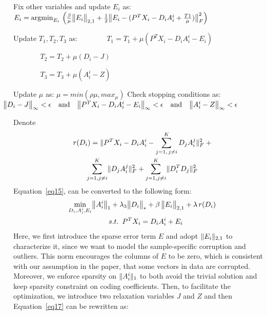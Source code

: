 \documentclass[journal]{IEEEtran}
\makeatletter
\def\NoNumber#1{{\def\alglinenumber##1{}\State #1}\addtocounter{ALG@line}{-1}}
\DeclareMathOperator*{\argmin}{\arg\!\min}
\DeclarePairedDelimiter\norm{\lVert}{\rVert}
\makeatother
\begin{document}
\begin{algorithm}[h]
\begin{algorithmic}[1]
    \State Fix other variables and update $E_i$ as:
    \vspace{2mm}   
    \NoNumber{$E_i = \argmin_{E_i} \, \Big( \frac{\beta}{\mu} \norm[\big]{E_i}_{2,1} + \frac{1}{2} \norm[\big]{E_i - (P^T X_i - D_i A_i^i + \frac{T1}{\mu})}_{F}^2 \Big) $}
    \vspace{2mm}   
    \State Update $T_1,T_2,T_3$ as: 
    \vspace{2mm}    
    \NoNumber{$\hspace{45pt} T_1 = T_1 + \mu (P^T X_i - D_i A_i^i - E_i)$}
    \NoNumber{$\hspace{45pt} T_2 = T_2 + \mu (D_i - J)$} 
    \NoNumber{$\hspace{45pt} T_3 = T_3 + \mu (A_i^i - Z)$} 
    \vspace{2mm}    
    \State Update $\mu$ as: $\mu = min(\rho \mu, max_{\mu})$    
    \vspace{2mm}    
    \State Check stopping conditions as: 
    \vspace{2mm}
    \NoNumber{$\hspace{-15pt} \norm[\big]{D_i - J}_{\infty} < \epsilon \quad \text{and} \quad \norm[\big]{P^T X_i - D_i A_i^i - E_i}_{\infty} < \epsilon \quad \text{and} \quad \norm[\big]{A_i^i - Z}_{\infty} < \epsilon $}
\EndWhile
\end{algorithmic}
\end{algorithm}
Denote
\begin{gather}
r(D_i) = \norm{P^T X_i - D_i A_i^i - \sum_{\substack{j=1, \, j \neq i}}^K D_j A_i^j}_{F}^2 \> +
\label{eq16} \\ \notag
\sum_{\substack{j=1, j \neq i}}^K \norm{D_j A_i^j}_{F}^2 + \sum_{\substack{j=1, j \neq i}}^K \norm{D_i^T D_j}_{F}^2
\end{gather}
Equation~\eqref{eq15}, can be converted to the following form:
\begin{gather}
\min_{D_i,A_i^i,E_i} \norm[\big]{A_i^i}_{1} + \lambda_3 \norm[\big]{D_i}_{*} + \beta \, \norm[\big]{E_i}_{2,1} + \lambda \, r(D_i)
\label{eq17} \\ \notag
\quad s.t. \,\,\, P^T X_i = D_i A_i^i + E_i
\end{gather}
Here, we first introduce the sparse error term $E$ and adopt $\norm{E_i}_{2,1}$ to characterize it, since we want to model the sample-specific corruption and outliers. This norm encourages the columns of $E$ to be zero, which is consistent with our assumption in the paper, that some vectors in data are corrupted. Moreover, we enforce sparsity on $\norm{A_i^i}_{1}$ to both avoid the trivial solution and keep sparsity constraint on coding coefficients. Then, to facilitate the optimization, we introduce two relaxation variables $J$ and $Z$ and then Equation~\eqref{eq17} can be rewritten as:
\end{document}
